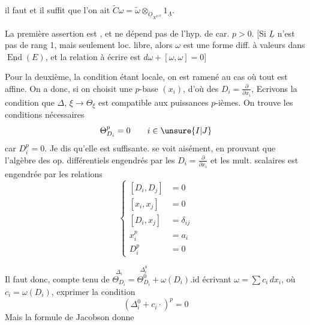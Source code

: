 il faut et il suffit que l'on ait $\widetilde C\omega=\widetilde\omega\otimes_{\underline O_{X^{p/S}}}1_{\underline\Lambda}$.

La première assertion est , et ne dépend pas de l'hyp. de car. $p>0$. [Si $\underline L$ n'est pas de rang 1, mais seulement loc. libre, alors $\omega$ est une forme diff. à valeurs dans $\underline{\operatorname{End}}(E)$, et la relation à écrire est $d\omega+[\omega,\omega]=0$]


Pour la deuxième, la condition étant locale, on est ramené au cas où tout est affine. On a donc, si on choisit une $p$-base $(x_i)$, d'où des $D_i=\frac{\partial}{\partial x_i}$,
 Ecrivons la condition que $\Delta$,  $\xi\longrightarrow\Theta_\xi$  est compatible aux puissances $p$-ièmes. On trouve  les conditions nécessaires
\[
 \Theta_{D_i}^{p}=0\qquad i\in \unsure{I|J}
\]
car $D_i^p=0$. Je dis qu'elle est suffisante.  se voit aisément, en prouvant que l'algèbre des  op. différentiels engendrés par les $D_i=\frac{\partial}{\partial x_i}$ et les mult.  scalaires est engendrée par  les relations
\[
 \left\{\begin{aligned}
 [D_i,D_j]&=0\\
 [x_i,x_j]&=0\\
 [D_i,x_j]&=\delta_{ij}\\
 x_i^p&=a_i\\
 D_i^p&=0
 \end{aligned}\right.
\]

Il faut donc, compte tenu de $\overset{\Delta_i}{\Theta_{D_i}}=\overset{\Delta_i^0}{\Theta^0_{D_i}}+\omega(D_i).\mathrm{id}$ écrivant $\omega=\sum c_i\,dx_i$, où $c_i=\omega(D_i)$, exprimer la condition
\[
 (\Delta_i^0+c_i\cdot)^p=0
\]
Mais la formule de Jacobson donne

